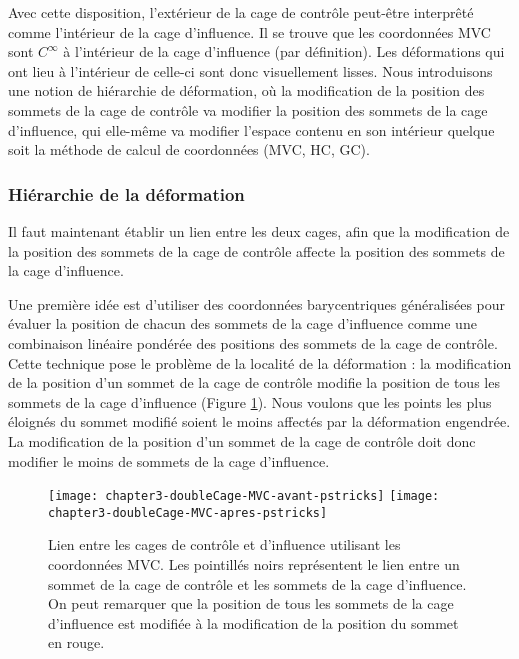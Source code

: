 Avec cette disposition, l'extérieur de la cage de contrôle peut-être
interprêté comme l'intérieur de la cage d'influence. Il se trouve que les
coordonnées MVC sont $C^{\infty}$ à l'intérieur de la cage d'influence (par
définition). Les déformations qui ont lieu à l'intérieur de celle-ci sont donc
visuellement lisses. Nous introduisons une notion de hiérarchie de
déformation, où la modification de la position des sommets de la cage de
contrôle va modifier la position des sommets de la cage d'influence, qui 
elle-même va modifier l'espace contenu en son intérieur quelque soit la méthode de
calcul de coordonnées (MVC, HC, GC). \\

\subsubsection{Hiérarchie de la déformation}

Il faut maintenant établir un lien entre les deux cages, afin que la
modification de la position des sommets de la cage de contrôle affecte la
position des sommets de la cage d'influence.

Une première idée est d'utiliser des coordonnées barycentriques généralisées
pour évaluer la position de chacun des sommets de la cage d'influence comme
une combinaison linéaire pondérée des positions des sommets de la cage de
contrôle. Cette technique pose le problème de la localité de la déformation :
la modification de la position d'un sommet de la cage de contrôle modifie la
position de tous les sommets de la cage d'influence (Figure \ref{MELDMV}).
Nous voulons que les points les plus éloignés du sommet modifié soient le
moins affectés par la déformation engendrée. La modification de la position
d'un sommet de la cage de contrôle doit donc modifier le moins de sommets de
la cage d'influence.

\begin{figure}[ht]
\begin{center}
  \texttt{[image: chapter3-doubleCage-MVC-avant-pstricks]}
  \texttt{[image: chapter3-doubleCage-MVC-apres-pstricks]}

  \caption[Lien double-cage MVC] {Lien entre les cages de contrôle et
d'influence utilisant les coordonnées MVC. Les pointillés noirs représentent
le lien entre un sommet de la cage de contrôle et les sommets de la cage
d'influence. On peut remarquer que la position de tous les sommets de la cage
d'influence est modifiée à la modification de la position du sommet en rouge.}

  \label{MELDMV}
\end{center}
\end{figure}

